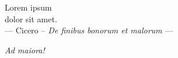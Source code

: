 \thispagestyle{empty}
\vspace*{3cm}

\begin{center}
    Lorem ipsum \\
    dolor sit amet. \\
    --- Cicero -- \emph{De finibus bonorum et malorum} ---
\end{center}

\medskip

\begin{center}
    \hfill \emph{Ad maiora!} \\
\end{center}
